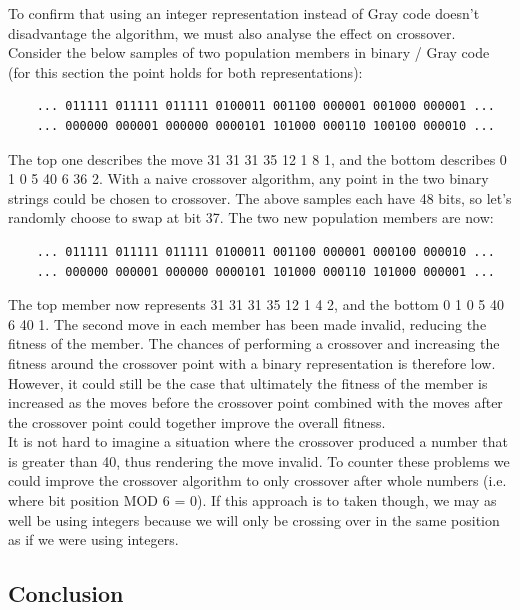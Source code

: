 \documentclass[]{report}
\begin{document}
To confirm that using an integer representation instead of Gray code doesn't disadvantage the algorithm, we must also analyse the effect on crossover. Consider the below samples of two population members in binary / Gray code (for this section the point holds for both representations):

\begin{verbatim}
	... 011111 011111 011111 0100011 001100 000001 001000 000001 ...
	... 000000 000001 000000 0000101 101000 000110 100100 000010 ...
\end{verbatim}

The top one describes the move 31 31 31 35 12 1 8 1, and the bottom describes 0 1 0 5 40 6 36 2. With a naive crossover algorithm, any point in the two binary strings could be chosen to crossover. The above samples each have 48 bits, so let's randomly choose to swap at bit 37. The two new population members are now:

\begin{verbatim}
	... 011111 011111 011111 0100011 001100 000001 000100 000010 ...
	... 000000 000001 000000 0000101 101000 000110 101000 000001 ...
\end{verbatim}

The top member now represents 31 31 31 35 12 1 4 2, and the bottom 0 1 0 5 40 6 40 1. The second move in each member has been made invalid, reducing the fitness of the member. The chances of performing a crossover and increasing the fitness around the crossover point with a binary representation is therefore low. However, it could still be the case that ultimately the fitness of the member is increased as the moves before the crossover point combined with the moves after the crossover point could together improve the overall fitness. \\

It is not hard to imagine a situation where the crossover produced a number that is greater than 40, thus rendering the move invalid. To counter these problems we could improve the crossover algorithm to only crossover after whole numbers (i.e. where bit position MOD 6 = 0). If this approach is to taken though, we may as well be using integers because we will only be crossing over in the same position as if we were using integers. \\

\subsection{Conclusion}
\end{document}

